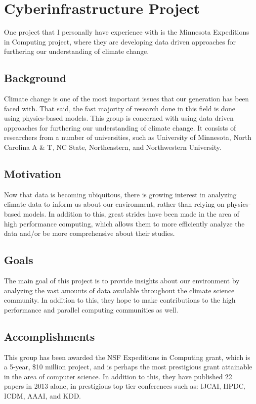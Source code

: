 \documentclass[11pt]{article}
\begin{document}
\section{Cyberinfrastructure Project}
One project that I personally have experience with is the Minnesota Expeditions in Computing project, where they are developing data driven approaches for furthering our understanding of climate change.

\subsection{Background}
Climate change is one of the most important issues that our generation has been faced with.  That said, the fast majority of research done in this field is done using physics-based models.  This group is concerned with using data driven approaches for furthering our understanding of climate change.  It consists of researchers from a number of universities, such as University of Minnesota, North Carolina A \& T, NC State, Northeastern, and Northwestern University.

\subsection{Motivation}
Now that data is becoming ubiquitous, there is growing interest in analyzing climate data to inform us about our environment, rather than relying on physics-based models.  In addition to this, great strides have been made in the area of high performance computing, which allows them to more efficiently analyze the data and/or be more comprehensive about their studies.

\subsection{Goals}
The main goal of this project is to provide insights about our environment by analyzing the vast amounts of data available throughout the climate science community.   In addition to this, they hope to make contributions to the high performance and parallel computing communities as well.  

\subsection{Accomplishments}
This group has been awarded the NSF Expeditions in Computing grant, which is a 5-year, \$10 million project, and is perhaps the most prestigious grant attainable in the area of computer science.  In addition to this, they have published 22 papers in 2013 alone, in prestigious top tier conferences such as: IJCAI, HPDC, ICDM, AAAI, and KDD.  
\end{document}

